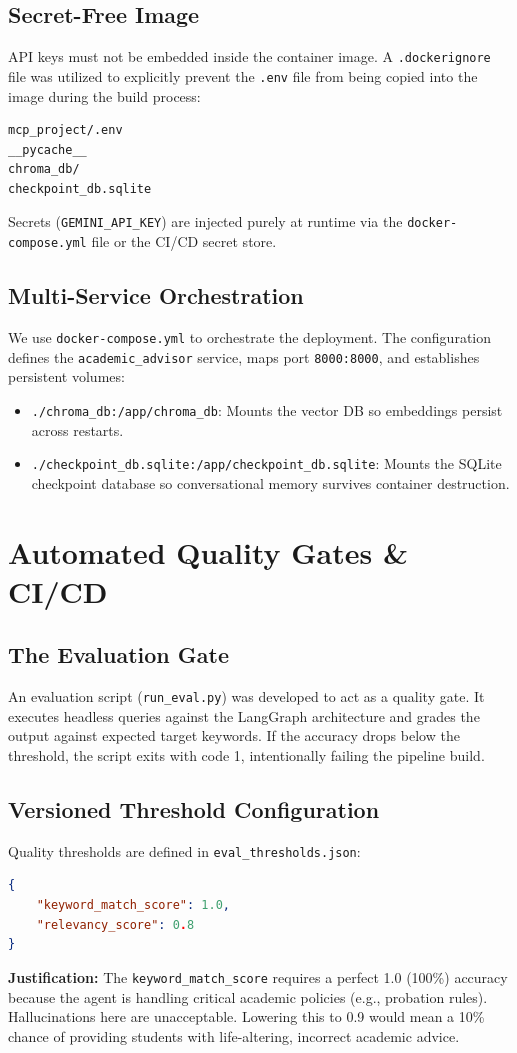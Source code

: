 \documentclass[12pt, a4paper]{article}
\begin{document}
\subsection{Secret-Free Image}
API keys must not be embedded inside the container image. 
A \texttt{.dockerignore} file was utilized to explicitly prevent the \texttt{.env} file from being copied into the image during the build process:
\begin{lstlisting}
mcp_project/.env
__pycache__
chroma_db/
checkpoint_db.sqlite
\end{lstlisting}
Secrets (\texttt{GEMINI\_API\_KEY}) are injected purely at runtime via the \texttt{docker-compose.yml} file or the CI/CD secret store.

\subsection{Multi-Service Orchestration}
We use \texttt{docker-compose.yml} to orchestrate the deployment. The configuration defines the \texttt{academic\_advisor} service, maps port \texttt{8000:8000}, and establishes persistent volumes:
\begin{itemize}
    \item \texttt{./chroma\_db:/app/chroma\_db}: Mounts the vector DB so embeddings persist across restarts.
    \item \texttt{./checkpoint\_db.sqlite:/app/checkpoint\_db.sqlite}: Mounts the SQLite checkpoint database so conversational memory survives container destruction.
\end{itemize}

\section{Automated Quality Gates \& CI/CD}

\subsection{The Evaluation Gate}
An evaluation script (\texttt{run\_eval.py}) was developed to act as a quality gate. It executes headless queries against the LangGraph architecture and grades the output against expected target keywords. If the accuracy drops below the threshold, the script exits with code 1, intentionally failing the pipeline build.

\subsection{Versioned Threshold Configuration}
Quality thresholds are defined in \texttt{eval\_thresholds.json}:
\begin{lstlisting}[language=json]
{
    "keyword_match_score": 1.0,
    "relevancy_score": 0.8
}
\end{lstlisting}
\textbf{Justification:} 
The \texttt{keyword\_match\_score} requires a perfect 1.0 (100\%) accuracy because the agent is handling critical academic policies (e.g., probation rules). Hallucinations here are unacceptable. Lowering this to 0.9 would mean a 10\% chance of providing students with life-altering, incorrect academic advice.
\end{document}
